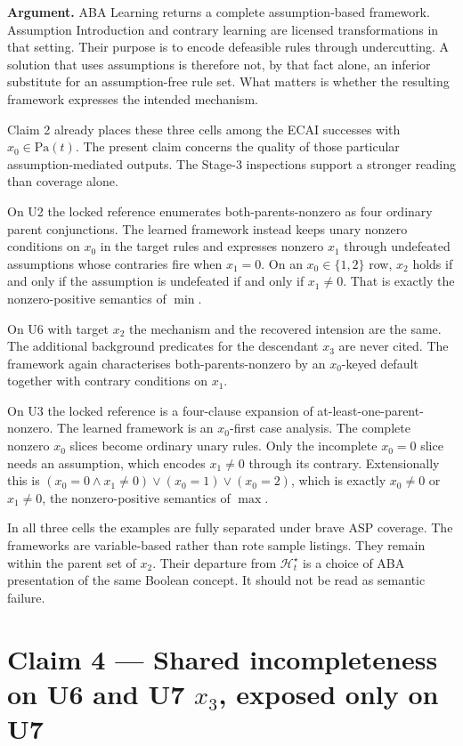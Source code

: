 \documentclass[11pt]{article}
\begin{document}
\textbf{Argument.} ABA Learning returns a complete assumption-based framework. Assumption Introduction and contrary learning are licensed transformations in that setting. Their purpose is to encode defeasible rules through undercutting. A solution that uses assumptions is therefore not, by that fact alone, an inferior substitute for an assumption-free rule set. What matters is whether the resulting framework expresses the intended mechanism.

Claim 2 already places these three cells among the ECAI successes with \(x_0\in\mathrm{Pa}(t)\). The present claim concerns the quality of those particular assumption-mediated outputs. The Stage-3 inspections support a stronger reading than coverage alone.

On U2 the locked reference enumerates both-parents-nonzero as four ordinary parent conjunctions. The learned framework instead keeps unary nonzero conditions on \(x_0\) in the target rules and expresses nonzero \(x_1\) through undefeated assumptions whose contraries fire when \(x_1=0\). On an \(x_0\in\{1,2\}\) row, \(x_2\) holds if and only if the assumption is undefeated if and only if \(x_1\neq 0\). That is exactly the nonzero-positive semantics of \(\min\).

On U6 with target \(x_2\) the mechanism and the recovered intension are the same. The additional background predicates for the descendant \(x_3\) are never cited. The framework again characterises both-parents-nonzero by an \(x_0\)-keyed default together with contrary conditions on \(x_1\).

On U3 the locked reference is a four-clause expansion of at-least-one-parent-nonzero. The learned framework is an \(x_0\)-first case analysis. The complete nonzero \(x_0\) slices become ordinary unary rules. Only the incomplete \(x_0=0\) slice needs an assumption, which encodes \(x_1\neq 0\) through its contrary. Extensionally this is \((x_0=0\land x_1\neq 0)\lor(x_0=1)\lor(x_0=2)\), which is exactly \(x_0\neq 0\) or \(x_1\neq 0\), the nonzero-positive semantics of \(\max\).

In all three cells the examples are fully separated under brave ASP coverage. The frameworks are variable-based rather than rote sample listings. They remain within the parent set of \(x_2\). Their departure from \(\mathcal{H}_t^\star\) is a choice of ABA presentation of the same Boolean concept. It should not be read as semantic failure.

\section{Claim 4 --- Shared incompleteness on U6 and U7 \(x_3\), exposed only on U7}
\end{document}
